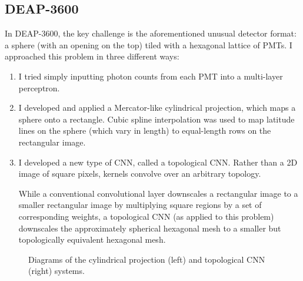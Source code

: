 \documentclass[12pt]{article}
\begin{document}
\subsection{DEAP-3600}

In DEAP-3600, the key challenge is the aforementioned unusual detector format: a sphere (with an opening on the top) tiled with a hexagonal lattice of PMTs. I approached this problem in three different ways:

\begin{enumerate}
    \item I tried simply inputting photon counts from each PMT into a multi-layer perceptron.

    \item I developed and applied a Mercator-like cylindrical projection, which maps a sphere onto a rectangle. Cubic spline interpolation was used to map latitude lines on the sphere (which vary in length) to equal-length rows on the rectangular image.

    \item I developed a new type of CNN, called a topological CNN. Rather than a 2D image of square pixels, kernels convolve over an arbitrary topology.
    
    While a conventional convolutional layer downscales a rectangular image to a smaller rectangular image by multiplying square regions by a set of corresponding weights, a topological CNN (as applied to this problem) downscales the approximately spherical hexagonal mesh to a smaller but topologically equivalent hexagonal mesh.
\end{enumerate}

\begin{figure}[ht]
    \centering
    \qquad
    \caption{Diagrams of the cylindrical projection (left) and topological CNN (right) systems.}
\end{figure}
\end{document}
